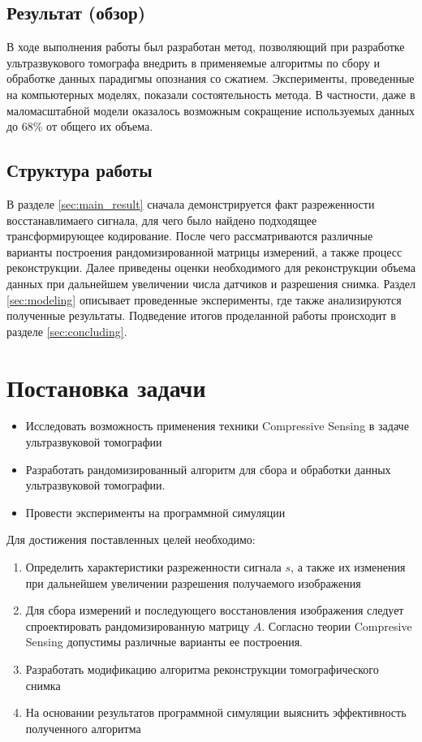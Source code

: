 \documentclass[14pt]{matmex-diploma}
\begin{document}
\subsection{Результат (обзор)}
В ходе выполнения работы был разработан метод, позволяющий при разработке ультразвукового томографа внедрить в применяемые алгоритмы по сбору и обработке данных парадигмы опознания со сжатием. Эксперименты, проведенные на компьютерных моделях, показали состоятельность метода. В частности, даже в маломасштабной модели оказалось возможным сокращение используемых данных до 68\% от общего их объема. 

\subsection{Структура работы}
В разделе \ref{sec:main_result} сначала демонстрируется факт разреженности восстанавлимаего сигнала, для чего было найдено подходящее трансформирующее кодирование. После чего рассматриваются различные варианты построения рандомизированной матрицы измерений, а также процесс реконструкции. Далее приведены оценки необходимого для реконструкции объема данных при дальнейшем увеличении числа датчиков и разрешения снимка. Раздел \ref{sec:modeling} описывает проведенные эксперименты, где также анализируются полученные результаты. Подведение итогов проделанной работы происходит в разделе \ref{sec:concluding}.

\section{Постановка задачи}
\begin{itemize}
  \item Исследовать возможность применения техники Compressive Sensing в задаче ультразвуковой томографии
  \item Разработать рандомизированный алгоритм для сбора и обработки данных ультразвуковой томографии. 
  \item Провести эксперименты на программной симуляции
\end{itemize}

Для достижения поставленных целей необходимо:
\begin{enumerate}
\item Определить характеристики разреженности сигнала $s$, а также их изменения при дальнейшем увеличении разрешения получаемого изображения
\item Для сбора измерений и последующего восстановления изображения следует спроектировать рандомизированную матрицу $A$. Согласно теории Compresive Sensing допустимы различные варианты ее построения. 
\item Разработать модификацию алгоритма реконструкции томографического снимка
\item На основании результатов программной симуляции выяснить эффективность полученного алгоритма
\end{enumerate}
\end{document}
